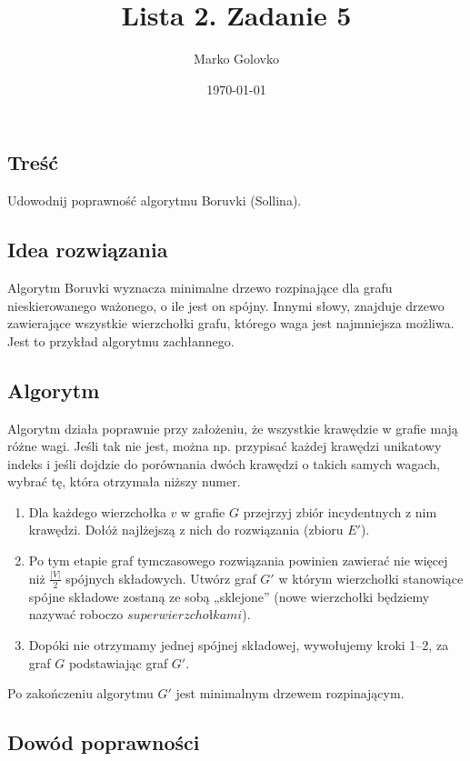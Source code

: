 \documentclass[12pt]{article}
\title{Lista 2. Zadanie 5}
\author{Marko Golovko}
\date{\today}
\begin{document}
\maketitle

\subsection*{Treść}

Udowodnij poprawność algorytmu Boruvki (Sollina).


\subsection*{Idea rozwiązania}

Algorytm Boruvki wyznacza minimalne drzewo rozpinające dla grafu nieskierowanego ważonego, o ile jest on spójny. Innymi słowy, znajduje drzewo zawierające wszystkie wierzchołki grafu, którego waga jest najmniejsza możliwa. Jest to przykład algorytmu zachłannego.

\subsection*{Algorytm}
 
Algorytm działa poprawnie przy założeniu, że wszystkie krawędzie w grafie mają różne wagi. Jeśli tak nie jest, można np. przypisać każdej krawędzi unikatowy indeks i jeśli dojdzie do porównania dwóch krawędzi o takich samych wagach, wybrać tę, która otrzymała niższy numer. 
 
\begin{enumerate} 
  \item Dla każdego wierzchołka $v$ w grafie $G$ przejrzyj zbiór incydentnych z nim krawędzi. Dołóż najlżejszą z nich do rozwiązania (zbioru $E'$). 
  \item Po tym etapie graf tymczasowego rozwiązania powinien zawierać nie więcej niż ${\frac {|V|}{2}}$  spójnych składowych. Utwórz graf $G'$ w którym wierzchołki stanowiące spójne składowe zostaną ze sobą „sklejone” (nowe wierzchołki będziemy nazywać roboczo $superwierzchołkami$).  
  \item Dopóki nie otrzymamy jednej spójnej składowej, wywołujemy kroki 1–2, za graf $G$ podstawiając graf $G'$.
\end{enumerate}
Po zakończeniu algorytmu $G'$ jest minimalnym drzewem rozpinającym.

\subsection*{Dowód poprawności}
\end{document}
